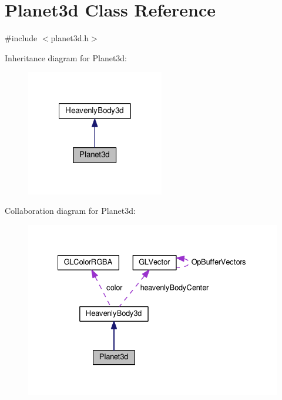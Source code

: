 \section{\-Planet3d \-Class \-Reference}
\label{d1/d39/classPlanet3d}


{\ttfamily \#include $<$planet3d.\-h$>$}



\-Inheritance diagram for \-Planet3d\-:\nopagebreak
\begin{figure}[H]
\begin{center}
\leavevmode
\includegraphics[width=170pt]{d7/d7e/classPlanet3d__inherit__graph}
\end{center}
\end{figure}


\-Collaboration diagram for \-Planet3d\-:\nopagebreak
\begin{figure}[H]
\begin{center}
\leavevmode
\includegraphics[width=331pt]{d2/de3/classPlanet3d__coll__graph}
\end{center}
\end{figure}
